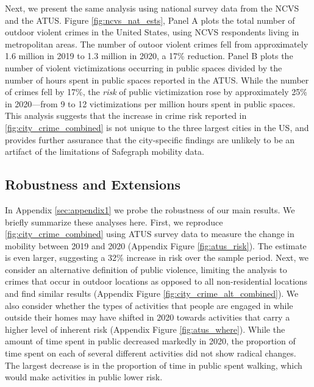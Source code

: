\documentclass[12pt]{article}
\begin{document}
Next, we present the same analysis using national survey data from the NCVS and the ATUS. Figure \ref{fig:ncvs_nat_ests}, Panel A plots the total number of outdoor violent crimes in the United States, using NCVS respondents living in metropolitan areas. The number of outoor violent crimes fell from approximately 1.6 million in 2019 to 1.3 million in 2020, a 17\% reduction. Panel B plots the number of violent victimizations occurring in public spaces divided by the number of hours spent in public spaces reported in the ATUS. While the number of crimes fell by 17\%, the \emph{risk} of public victimization rose by approximately 25\% in 2020---from 9 to  12 victimizations per million hours spent in public spaces. This analysis suggests that the increase in crime risk reported in \autoref{fig:city_crime_combined} is not unique to the three largest cities in the US, and provides further assurance that the city-specific findings are unlikely to be an artifact of the limitations of Safegraph mobility data. 


\subsection{Robustness and Extensions}
In Appendix \ref{sec:appendix1} we probe the robustness of our main results. We briefly summarize these analyses here. First, we reproduce \autoref{fig:city_crime_combined} using ATUS survey data to measure the change in mobility between 2019 and 2020 (Appendix Figure \ref{fig:atus_risk}). The estimate is even larger, suggesting a 32\% increase in risk over the sample period. Next, we consider an alternative definition of public violence, limiting the analysis to crimes that occur in outdoor locations as opposed to all non-residential locations and find similar results (Appendix Figure \ref{fig:city_crime_alt_combined}). We also consider whether the types of activities that people are engaged in while outside their homes may have shifted in 2020 towards activities that carry a higher level of inherent risk (Appendix Figure \ref{fig:atus_where}). While the amount of time spent in public decreased markedly in 2020, the proportion of time spent on each of several different activities did not show radical changes. The largest decrease is in the proportion of time in public spent walking, which would make activities in public lower risk.
\end{document}
